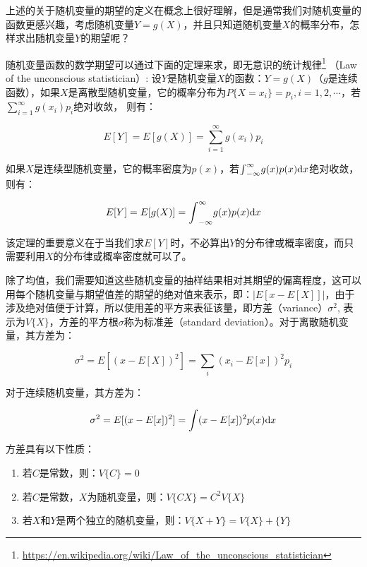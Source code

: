 \noindent 上述的关于随机变量的期望的定义在概念上很好理解，但是通常我们对随机变量的函数更感兴趣，考虑随机变量$Y=g(X)$，并且只知道随机变量$X$的概率分布，怎样求出随机变量$Y$的期望呢？

随机变量函数的数学期望可以通过下面的定理来求，即无意识的统计规律\footnote{\url{https://en.wikipedia.org/wiki/Law_of_the_unconscious_statistician}}
（Law of the unconscious statistician）: 设$Y$是随机变量$X$的函数：$Y=g(X)$（$g$是连续函数），如果$X$是离散型随机变量，它的概率分布为$P\{X=x_i\}=p_i,i=1,2,\cdots$，若$\sum^{\infty}_{i=1}g(x_i)p_i$绝对收敛， 则有：

\begin{equation}
	E[Y]=E[g(X)]=\sum^{\infty}_{i=1}g(x_i)p_i
\end{equation}

\noindent 如果$X$是连续型随机变量，它的概率密度为$p(x)$，若${\rm \int}^{\infty}_{-\infty}g(x)p(x){\rm d}x$绝对收敛，则有：

\begin{equation}
	E[Y]=E[g(X)]={\rm \int}^{\infty}_{-\infty}g(x)p(x){\rm d}x
\end{equation}

\noindent 该定理的重要意义在于当我们求$E[Y]$时，不必算出$Y$的分布律或概率密度，而只需要利用$X$的分布律或概率密度就可以了。

除了均值，我们需要知道这些随机变量的抽样结果相对其期望的偏离程度，这可以用每个随机变量与期望值差的期望的绝对值来表示，即：$|E[x-E[X]]|$，由于涉及绝对值便于计算，所以使用差的平方来表征该量，即方差（variance）$\sigma^2$, 表示为$V\{X\}$，方差的平方根$\sigma$称为标准差（standard deviation）。对于离散随机变量，其方差为：

\begin{equation}
	\sigma^2=E[(x-E[X])^2]=\sum_i (x_i-E[x])^2p_i
\end{equation}

\noindent 对于连续随机变量，其方差为：

\begin{equation}\label{e:discrete-variance}
	\sigma^2=E[(x-E[x])^2]={\rm \int} (x-E[x])^2 p(x){\rm d}x
\end{equation}

方差具有以下性质：
\begin{enumerate}
	\item 若$C$是常数，则：$V\{C\}=0$
	\item 若$C$是常数，$X$为随机变量，则：$V\{CX\}=C^2V\{X\}$
	\item 若$X$和$Y$是两个独立的随机变量，则：$V\{X+Y\}=V\{X\}+\{Y\}$
\end{enumerate}





